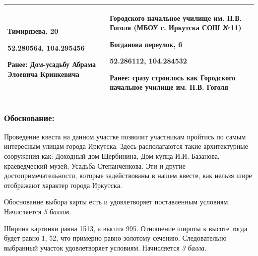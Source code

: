 \begin{longtable}{|p{8cm}|p{8cm}|}
    Тимирязева, 20
    
    52.280564, 104.295456 

    Ранее: Дом-усадьбу Абрама Элоевича Кринкевича & Городского начальное училище им. Н.В. Гоголя (МБОУ г. Иркутска СОШ №11)
    
    Богданова переулок, 6 

    52.286112, 104.284532
    
    Ранее: сразу строилось как Городского начальное училище им. Н.В. Гоголя \\
    \hline    
\end{longtable}

\subsubsection*{Обоснование:}

Проведение квеста на данном участке позволит участникам пройтись по самым интересным улицам города Иркутска. Здесь располагаются такие архитектурные сооружения как:  Доходный дом Щербинина, Дом купца И.И. Базанова, краеведческий музей, Усадьба Степанченкова. Эти и другие достопримечательности, которые задействованы в нашем квесте, как нельзя шире отображают характер города Иркутска. 


\markSection

Обоснование выбора карты есть и удовлетворяет поставленным условиям. Начисляется \textit{5 баллов.}

Ширина картинки равна 1513, а высота 995. Отношение широты к высоте тогда будет равно 1, 52, что примерно равно золотому сечению. Следовательно выбранный участок удовлетворяет условиям. Начисляется \textit{3 балла.}
